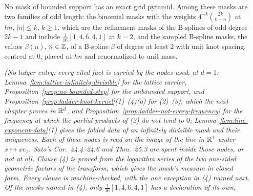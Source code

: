 \begin{proposition}
\begin{enumerate}
No mask of bounded support has an exact grid pyramid. Among these masks are two families of odd
length: the binomial masks with the weights $4^{-k}\binom{2k}{k+n}$ at $hn$, $|n| \le k$,
$k \ge 1$, which are the refinement masks of the B-splines of odd degree $2k - 1$ and include
$\tfrac1{16}[1,4,6,4,1]$ at $k = 2$, and the sampled B-spline masks, the values $\beta(n)$, $n \in \mathbb{Z}$, of a B-spline $\beta$
of degree at least $2$ with unit knot spacing, centred at $0$, placed at $hn$ and renormalized to unit
mass.
\end{enumerate}
\statusT\quad\emph{(No ledger entry: every cited fact is carried by the nodes used, at $d = 1$:
Lemma~\ref{lem:lattice-infinitely-divisible} for the lattice carrier,
Proposition~\ref{prop:no-bounded-step} for the unbounded support, and
Proposition~\ref{prop:ladder-knot-kernel}(1)--(4)(a) for (2)--(3), which the next chapter proves
in $\mathbb{R}^d$, and Proposition~\ref{prop:ladder-not-every-frequency} for the frequency at which the
partial products of (2) do not tend to $0$; Lemma~\ref{lem:line-exponent-data}(1) gives the
folded data of an infinitely divisible mask and their uniqueness. Each of these nodes is read on
the image of the line in $\mathbb{R}^1$ under $x \mapsto xe_1$. Sato's Cor.~24.4--24.6 and Thm.~25.3
are spent inside those nodes, or not at all. Clause (4) is proved from the logarithm series of the
two one-sided geometric factors of the transform, which gives the mask's \Levy{} measure in closed
form. Every clause is machine-checked, with the one exception in (4) named next. Of the masks
named in (4), only $\tfrac1{16}[1,4,6,4,1]$ has a declaration of its own,
}
\end{proposition}
